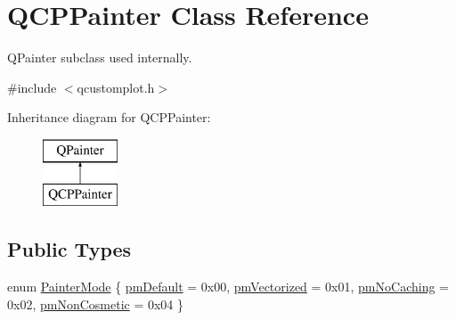 \hypertarget{class_q_c_p_painter}{}\section{Q\+C\+P\+Painter Class Reference}
\label{class_q_c_p_painter}


Q\+Painter subclass used internally.  




{\ttfamily \#include $<$qcustomplot.\+h$>$}

Inheritance diagram for Q\+C\+P\+Painter\+:\begin{figure}[H]
\begin{center}
\leavevmode
\includegraphics[height=2.000000cm]{class_q_c_p_painter}
\end{center}
\end{figure}
\subsection*{Public Types}
\begin{DoxyCompactItemize}
\item 
enum \hyperlink{class_q_c_p_painter_a156cf16444ff5e0d81a73c615fdb156d}{Painter\+Mode} \{ \hyperlink{class_q_c_p_painter_a156cf16444ff5e0d81a73c615fdb156da3bac5e87e3d58553b297befb4eee2a45}{pm\+Default} = 0x00, 
\hyperlink{class_q_c_p_painter_a156cf16444ff5e0d81a73c615fdb156daeda679cd55dcd468341d07d48a30b6ab}{pm\+Vectorized} = 0x01, 
\hyperlink{class_q_c_p_painter_a156cf16444ff5e0d81a73c615fdb156dae78f9a4eb277a5f9207f50850a51a0b0}{pm\+No\+Caching} = 0x02, 
\hyperlink{class_q_c_p_painter_a156cf16444ff5e0d81a73c615fdb156dac1e481bfaf408f2bd2eaad3ec341f36b}{pm\+Non\+Cosmetic} = 0x04
 \}
\end{DoxyCompactItemize}
